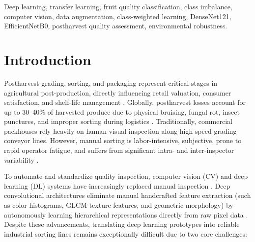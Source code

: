 \documentclass[conference]{IEEEtran}
\begin{document}
\begin{IEEEkeywords}
Deep learning, transfer learning, fruit quality classification, class imbalance, computer vision, data augmentation, class-weighted learning, DenseNet121, EfficientNetB0, postharvest quality assessment, environmental robustness.
\end{IEEEkeywords}

\section{Introduction}
Postharvest grading, sorting, and packaging represent critical stages in agricultural post-production, directly influencing retail valuation, consumer satisfaction, and shelf-life management \cite{kavdir2012apple, zhang2018fruit, bhargava2016fruits}. Globally, postharvest losses account for up to 30--40\% of harvested produce due to physical bruising, fungal rot, insect punctures, and improper sorting during logistics \cite{cubero2011review, nandi2014machine}. Traditionally, commercial packhouses rely heavily on human visual inspection along high-speed grading conveyor lines. However, manual sorting is labor-intensive, subjective, prone to rapid operator fatigue, and suffers from significant intra- and inter-inspector variability \cite{brosnan2002inspection, patel2012fruit}.

To automate and standardize quality inspection, computer vision (CV) and deep learning (DL) systems have increasingly replaced manual inspection \cite{kamilaris2018deep, rocha2010automatic, saleem2019plant}. Deep convolutional architectures eliminate manual handcrafted feature extraction (such as color histograms, GLCM texture features, and geometric morphology) by autonomously learning hierarchical representations directly from raw pixel data \cite{lecun2015deep}. Despite these advancements, translating deep learning prototypes into reliable industrial sorting lines remains exceptionally difficult due to two core challenges:
\end{document}
